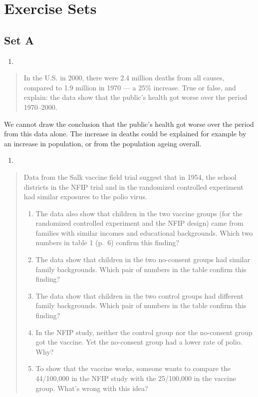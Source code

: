 \documentclass[
]{book}
\providecommand{\tightlist}{%
  \setlength{\itemsep}{0pt}\setlength{\parskip}{0pt}}
\begin{document}
\hypertarget{exercise-sets}{%
\section{Exercise Sets}\label{exercise-sets}}

\hypertarget{set-a}{%
\subsection*{Set A}\label{set-a}}

\begin{enumerate}
\def\labelenumi{\arabic{enumi}.}
\tightlist
\item
\end{enumerate}

\begin{quote}
In the U.S. in 2000, there were 2.4 million deaths from all causes, compared to 1.9 million in 1970 --- a 25\% increase. True or false, and explain: the data show that the public's health got worse over the period 1970--2000.
\end{quote}

We cannot draw the conclusion that the public's health got worse over the period from this data alone. The increase in deaths could be explained for example by an increase in population, or from the population ageing overall.

\begin{enumerate}
\def\labelenumi{\arabic{enumi}.}
\setcounter{enumi}{1}
\tightlist
\item
\end{enumerate}

\begin{quote}
Data from the Salk vaccine field trial suggest that in 1954, the school districts in the NFIP trial and in the randomized controlled experiment had similar exposures to the polio virus.

\begin{enumerate}
\def\labelenumi{\alph{enumi}.}
\item
  The data also show that children in the two vaccine groups (for the randomized controlled experiment and the NFIP design) came from families with similar incomes and educational backgrounds. Which two numbers in table 1 (p.~6) confirm this finding?
\item
  The data show that children in the two no-consent groups had similar family backgrounds. Which pair of numbers in the table confirm this finding?
\item
  The data show that children in the two control groups had different family backgrounds. Which pair of numbers in the table confirm this finding?
\item
  In the NFIP study, neither the control group nor the no-consent group got the vaccine. Yet the no-consent group had a lower rate of polio. Why?
\item
  To show that the vaccine works, someone wants to compare the 44/100,000 in the NFIP study with the 25/100,000 in the vaccine group. What's wrong with this idea?
\end{enumerate}
\end{quote}
\end{document}
